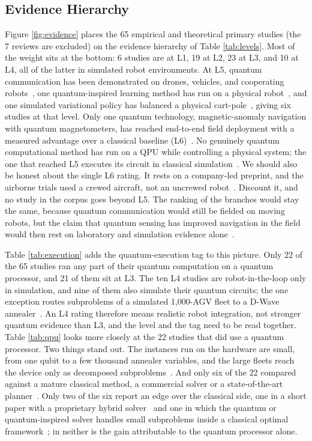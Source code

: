 \documentclass[acmsmall,screen,review]{acmart}
\begin{document}
\subsection{Evidence Hierarchy}\label{sec:hierarchy}
Figure \ref{fig:evidence} places the 65 empirical and theoretical primary studies (the 7 reviews are excluded) on the evidence hierarchy of Table \ref{tab:levels}. Most of the weight sits at the bottom: 6 studies are at L1, 19 at L2, 23 at L3, and 10 at L4, all of the latter in simulated robot environments. At L5, quantum communication has been demonstrated on drones, vehicles, and cooperating robots~\cite{Tian2023,Conrad2025,Khoshnoud2020,Liu2021}, one quantum-inspired learning method has run on a physical robot~\cite{Dong2012}, and one simulated variational policy has balanced a physical cart-pole~\cite{Sun2025}, giving six studies at that level. Only one quantum technology, magnetic-anomaly navigation with quantum magnetometers, has reached end-to-end field deployment with a measured advantage over a classical baseline (L6)~\cite{Muradoglu2025}. No genuinely quantum computational method has run on a QPU while controlling a physical system; the one that reached L5 executes its circuit in classical simulation~\cite{Sun2025}. We should also be honest about the single L6 rating. It rests on a company-led preprint, and the airborne trials used a crewed aircraft, not an uncrewed robot~\cite{Muradoglu2025}. Discount it, and no study in the corpus goes beyond L5. The ranking of the branches would stay the same, because quantum communication would still be fielded on moving robots, but the claim that quantum sensing has improved navigation in the field would then rest on laboratory and simulation evidence alone~\cite{Cheiney2018,Wang2021,Wang2023}.

Table \ref{tab:execution} adds the quantum-execution tag to this picture. Only 22 of the 65 studies ran any part of their quantum computation on a quantum processor, and 21 of them sit at L3. The ten L4 studies are robot-in-the-loop only in simulation, and nine of them also simulate their quantum circuits; the one exception routes subproblems of a simulated 1,000-AGV fleet to a D-Wave annealer~\cite{Quang2025}. An L4 rating therefore means realistic robot integration, not stronger quantum evidence than L3, and the level and the tag need to be read together. Table \ref{tab:qpu} looks more closely at the 22 studies that did use a quantum processor. Two things stand out. The instances run on the hardware are small, from one qubit to a few thousand annealer variables, and the large fleets reach the device only as decomposed subproblems~\cite{Quang2025}. And only six of the 22 compared against a mature classical method, a commercial solver or a state-of-the-art planner~\cite{Ohzeki2019,Smierzchalski2024,Leib2023,Willmann2025,Osaba2025,Gerlach2025}. Only two of the six report an edge over the classical side, one in a short paper with a proprietary hybrid solver~\cite{Osaba2025} and one in which the quantum or quantum-inspired solver handles small subproblems inside a classical optimal framework~\cite{Gerlach2025}; in neither is the gain attributable to the quantum processor alone.
\end{document}
